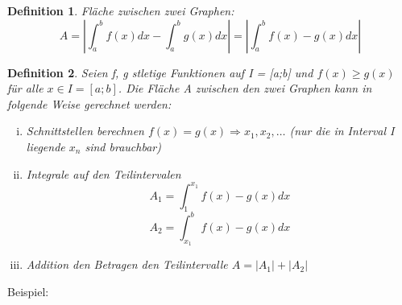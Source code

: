 \documentclass{article}
\newtheorem{definition}{Definition}
\begin{document}
	


\begin{definition}
Fläche zwischen zwei Graphen:
\[A = |\int_a^b f(x) dx - \int_a^b g(x) dx| = |\int_a^b f(x) - g(x) dx|\]


\end{definition}

\begin{definition}

Seien f, g stletige Funktionen auf I = [a;b] und $ f(x) \geq g(x) $ für alle $ x \in I = [a;b]$. Die Fläche A zwischen den zwei Graphen kann in folgende Weise gerechnet werden:

\begin{enumerate}[i)]

\item Schnittstellen berechnen $ f(x) = g(x) \Rightarrow x_1, x_2, \dots$ (nur die in Interval I liegende $x_n$ sind brauchbar)
\item Integrale auf den Teilintervalen \[A_1 = \int_1^{x_1} f(x) - g(x) dx\] \[A_2 = \int_{x_1}^b f(x) - g(x) dx\]
\item Addition den Betragen den Teilintervalle $A = |A_1| + |A_2|$

\end{enumerate}

\end{definition}

Beispiel:
\end{document}
